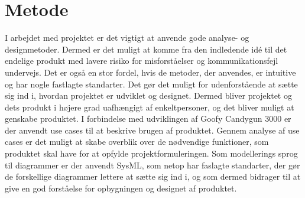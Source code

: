 \chapter{Metode}
I arbejdet med projektet er det vigtigt at anvende gode analyse- og designmetoder. Dermed er det muligt at komme fra den indledende idé til det endelige produkt med lavere risiko for misforståelser og kommunikationsfejl undervejs. Det er også en stor fordel, hvis de metoder, der anvendes, er intuitive og har nogle fastlagte standarter. Det gør det muligt for udenforstående at sætte sig ind i, hvordan projektet er udviklet og designet. Dermed bliver projektet og dets produkt i højere grad uafhængigt af enkeltpersoner, og det bliver muligt at genskabe produktet. 
I forbindelse med udviklingen af Goofy Candygun 3000 er der anvendt use cases til at beskrive brugen af produktet. Gennem analyse af use cases er det muligt at skabe overblik over de nødvendige funktioner, som produktet skal have for at opfylde projektformuleringen. Som modellerings sprog til diagrammer er der anvendt SysML, som netop har faslagte standarter, der gør de forskellige diagrammer lettere at sætte sig ind i, og som dermed bidrager til at give en god forståelse for opbygningen og designet af produktet.


